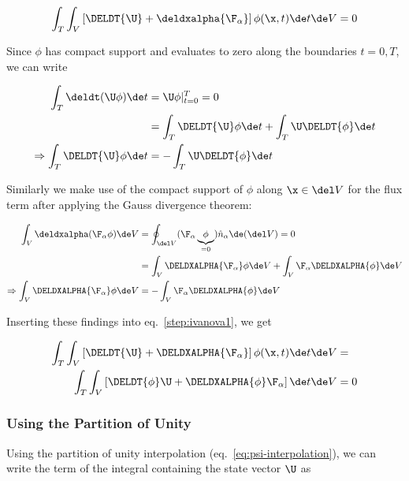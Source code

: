 \begin{align}
 \int_T \int_V \left[ \DELDT{\U} + \deldxalpha{\F_\alpha} \right] \phi(\x, t) \de t \de V = 0
 \label{step:ivanova1}
\end{align}

Since $\phi$ has compact support and evaluates to zero along the boundaries $t = 0, T$, we can write

\begin{align}
    \int_T \deldt(\U \phi) \de t &= \U \phi|_{t=0}^T = 0 \\
    &= \int_T \DELDT{\U} \phi \de t + \int_T \U \DELDT{\phi} \de t \\
    \Rightarrow \int_T \DELDT{\U} \phi \de t &= - \int_T \U \DELDT{\phi} \de t
\end{align}

Similarly we make use of the compact support of $\phi$ along $\x \in \del V$ for the flux term
after applying the Gauss divergence theorem:

\begin{align}
\int_V \deldxalpha (\F_\alpha \phi) \de V &=
    \oint_{\del V} (\F_\alpha \underbrace{\phi}_{= 0}) \hat{n}_\alpha \de (\del V) = 0 \\
&= \int_V \DELDXALPHA{\F_\alpha} \phi \de V + \int_V \F_\alpha \DELDXALPHA{\phi} \de V \\
\Rightarrow
\int_V \DELDXALPHA{\F_\alpha} \phi \de V &= - \int_V \F_\alpha \DELDXALPHA{\phi} \de V
\end{align}

Inserting these findings into eq.~\ref{step:ivanova1}, we get

\begin{align}
    \int_T \int_V \left[ \DELDT{\U} + \DELDXALPHA{\F_\alpha} \right] \phi(\x, t) \de t \de V &= \\
    \int_T \int_V \left[ \DELDT{\phi} \U + \DELDXALPHA{\phi} \F_\alpha \right] \de t \de V &= 0
\end{align}








\subsubsection{Using the Partition of Unity}

Using the partition of unity interpolation (eq.~\ref{eq:psi-interpolation}), we can write the term
of the integral containing the state vector $\U$ as

